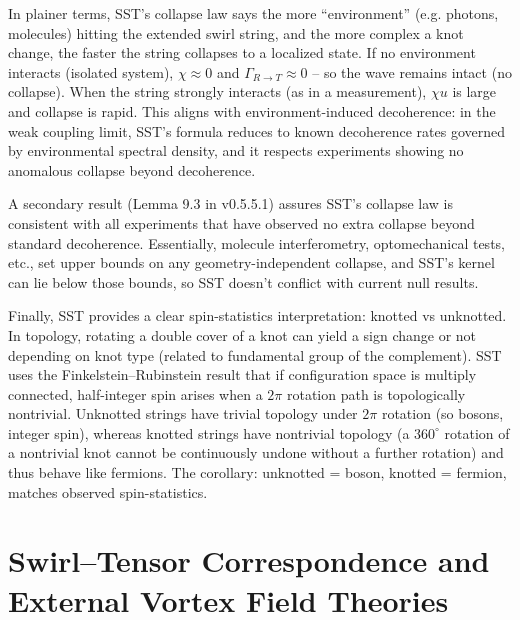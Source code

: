 \documentclass[10pt,reprint,aps,onecolumn,nofootinbib]{revtex4-2}
\begin{document}
	\noindent In plainer terms, SST’s collapse law says the more “environment” (e.g. photons, molecules) hitting the extended swirl string, and the more complex a knot change, the faster the string collapses to a localized state. If no environment interacts (isolated system), $\chi \approx 0$ and $\Gamma_{R\to T}\approx 0$ – so the wave remains intact (no collapse). When the string strongly interacts (as in a measurement), $\chi u$ is large and collapse is rapid. This aligns with environment-induced decoherence: in the weak coupling limit, SST’s formula reduces to known decoherence rates governed by environmental spectral density, and it respects experiments showing no anomalous collapse beyond decoherence.

	A secondary result (Lemma 9.3 in v0.5.5.1) assures SST’s collapse law is consistent with all experiments that have observed no extra collapse beyond standard decoherence. Essentially, molecule interferometry, optomechanical tests, etc., set upper bounds on any geometry-independent collapse, and SST’s kernel can lie below those bounds, so SST doesn’t conflict with current null results.

	Finally, SST provides a clear spin-statistics interpretation: knotted vs unknotted. In topology, rotating a double cover of a knot can yield a sign change or not depending on knot type (related to fundamental group of the complement). SST uses the Finkelstein–Rubinstein result that if configuration space is multiply connected, half-integer spin arises when a $2\pi$ rotation path is topologically nontrivial. Unknotted strings have trivial topology under $2\pi$ rotation (so bosons, integer spin), whereas knotted strings have nontrivial topology (a $360^\circ$ rotation of a nontrivial knot cannot be continuously undone without a further rotation) and thus behave like fermions. The corollary: unknotted = boson, knotted = fermion, matches observed spin-statistics.

    \section{Swirl–Tensor Correspondence and External Vortex Field Theories}
    \label{sec:swirl_tensor_correspondence}
\end{document}
